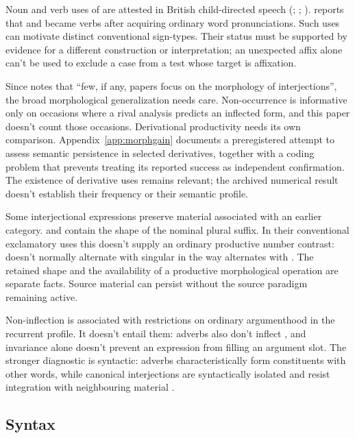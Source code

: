 \documentclass[12pt]{article}
\begin{document}
Noun and verb uses of  are attested in British child-directed speech (; ; \citealp[36]{stange2016}). \textcite[147]{wilkins1992} reports that  and  became verbs after acquiring ordinary word pronunciations. Such uses can motivate distinct conventional sign-types. Their status must be supported by evidence for a different construction or interpretation; an unexpected affix alone can't be used to exclude a case from a test whose target is affixation.

Since \textcite{libert2019} notes that \enquote{few, if any, papers focus on the morphology of interjections}, the broad morphological generalization needs care. Non-occurrence is informative only on occasions where a rival analysis predicts an inflected form, and this paper doesn't count those occasions. Derivational productivity needs its own comparison. Appendix~\ref{app:morphgain} documents a preregistered attempt to assess semantic persistence in selected derivatives, together with a coding problem that prevents treating its reported success as independent confirmation. The existence of derivative uses remains relevant; the archived numerical result doesn't establish their frequency or their semantic profile.

Some interjectional expressions preserve material associated with an earlier category.  and  contain the shape of the nominal plural suffix. In their conventional exclamatory uses this doesn't supply an ordinary productive number contrast:  doesn't normally alternate with singular  in the way  alternates with . The retained shape and the availability of a productive morphological operation are separate facts. Source material can persist without the source paradigm remaining active.

Non-inflection is associated with restrictions on ordinary argumenthood in the recurrent profile. It doesn't entail them: adverbs also don't inflect \citep[106]{ameka1992}, and invariance alone doesn't prevent an expression from filling an argument slot. The stronger diagnostic is syntactic: adverbs characteristically form constituents with other words, while canonical interjections are syntactically isolated and resist integration with neighbouring material \citep[152--153, 164]{meinard2015}.

\subsection{Syntax}\label{sec:syntax}
\end{document}

